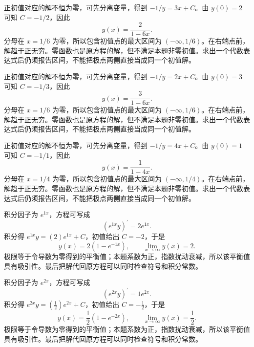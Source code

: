 \documentclass[12pt,fontset=fandol]{ctexart}
\begin{document}
\begin{solve}\label{ans:c22q10}
正初值对应的解不恒为零，可先分离变量，得到 $-1/y=3x+C$。由 $y(0)=2$ 可知 $C=-1/2$，因此
\[
y(x)=\frac{2}{1-6x}.
\]
分母在 $x=1/6$ 为零，所以包含初值点的最大区间为 $(-\infty,1/6)$。在右端点前，解趋于正无穷。零函数也是原方程的解，但不满足本题非零初值。求出一个代数表达式后仍须报告区间，不能把极点两侧直接当成同一个初值解。
\end{solve}

\begin{solve}\label{ans:c22q11}
正初值对应的解不恒为零，可先分离变量，得到 $-1/y=2x+C$。由 $y(0)=3$ 可知 $C=-1/3$，因此
\[
y(x)=\frac{3}{1-6x}.
\]
分母在 $x=1/6$ 为零，所以包含初值点的最大区间为 $(-\infty,1/6)$。在右端点前，解趋于正无穷。零函数也是原方程的解，但不满足本题非零初值。求出一个代数表达式后仍须报告区间，不能把极点两侧直接当成同一个初值解。
\end{solve}

\begin{solve}\label{ans:c22q12}
正初值对应的解不恒为零，可先分离变量，得到 $-1/y=4x+C$。由 $y(0)=1$ 可知 $C=-1/1$，因此
\[
y(x)=\frac{1}{1-4x}.
\]
分母在 $x=1/4$ 为零，所以包含初值点的最大区间为 $(-\infty,1/4)$。在右端点前，解趋于正无穷。零函数也是原方程的解，但不满足本题非零初值。求出一个代数表达式后仍须报告区间，不能把极点两侧直接当成同一个初值解。
\end{solve}

\begin{solve}\label{ans:c22q13}
积分因子为 $e^{1x}$，方程可写成
\[
\left(e^{1x}y\right)^{\prime}=2e^{1x}.
\]
积分得 $e^{1x}y=(2)e^{1x}+C$，初值给出 $C=-2$，于是
\[
y(x)=2(1-e^{-1x}),\qquad\lim_{x\to\infty}y(x)=2.
\]
极限等于令导数为零得到的平衡值；本题系数为正，指数扰动衰减，所以该平衡值具有吸引性。最后把解代回原方程可以同时检查符号和积分常数。
\end{solve}

\begin{solve}\label{ans:c22q14}
积分因子为 $e^{2x}$，方程可写成
\[
\left(e^{2x}y\right)^{\prime}=1e^{2x}.
\]
积分得 $e^{2x}y=(\frac{1}{2})e^{2x}+C$，初值给出 $C=-\frac{1}{2}$，于是
\[
y(x)=\frac{1}{2}(1-e^{-2x}),\qquad\lim_{x\to\infty}y(x)=\frac{1}{2}.
\]
极限等于令导数为零得到的平衡值；本题系数为正，指数扰动衰减，所以该平衡值具有吸引性。最后把解代回原方程可以同时检查符号和积分常数。
\end{solve}
\end{document}
